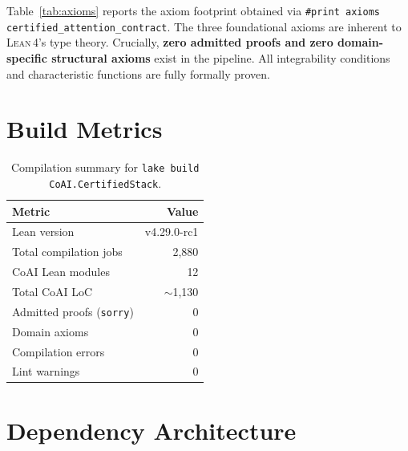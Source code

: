 \documentclass[11pt,a4paper,twocolumn]{article}
\theoremstyle{definition}
\theoremstyle{remark}
\newcommand{\lean}{\textsc{Lean\,4}}
\begin{document}
Table~\ref{tab:axioms} reports the axiom footprint obtained via
\texttt{\#print axioms certified\_attention\_contract}. The three
foundational axioms are inherent to \lean{}'s type theory.
Crucially, \textbf{zero admitted proofs and zero domain-specific structural axioms} exist in the pipeline. All integrability conditions and characteristic functions are fully formally proven.


\section{Build Metrics}
\label{sec:metrics}

\begin{table}[t]
\centering
\small
\caption{Compilation summary for \texttt{lake build CoAI.CertifiedStack}.}
\label{tab:build}
\begin{tabular}{@{}lr@{}}
\toprule
\textbf{Metric} & \textbf{Value} \\
\midrule
Lean version            & v4.29.0-rc1 \\
Total compilation jobs  & 2,880 \\
CoAI Lean modules       & 12 \\
Total CoAI LoC          & $\sim$1,130 \\
Admitted proofs (\texttt{sorry}) & 0 \\
Domain axioms           & 0 \\
Compilation errors      & 0 \\
Lint warnings           & 0 \\
\bottomrule
\end{tabular}
\end{table}


\section{Dependency Architecture}
\label{sec:arch}
\end{document}
